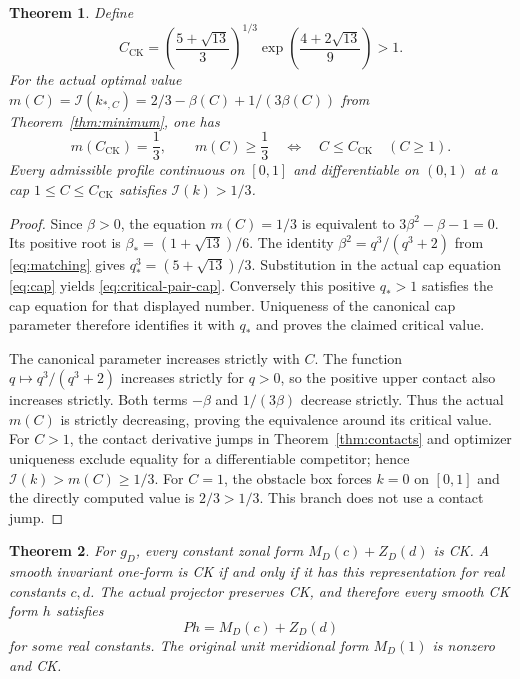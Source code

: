 \documentclass[11pt]{article}
\newtheorem{theorem}{Theorem}[section]
\newcommand{\I}{\mathcal I}
\begin{document}
\begin{theorem}\label{thm:critical-pair-cap}
Define
\begin{equation}\label{eq:critical-pair-cap}
 C_{\mathrm{CK}}
 =\left(\frac{5+\sqrt{13}}3\right)^{1/3}
       \exp\left(\frac{4+2\sqrt{13}}9\right)>1.
\end{equation}
For the actual optimal value
$m(C)=\I(k_{*,C})=2/3-\beta(C)+1/(3\beta(C))$ from
Theorem~\ref{thm:minimum}, one has
\[
 m(C_{\mathrm{CK}})=\frac13,\qquad
 m(C)\geq\frac13\quad\Longleftrightarrow\quad C\leq C_{\mathrm{CK}}
 \quad(C\geq1).
\]
Every admissible profile continuous on $[0,1]$ and differentiable on $(0,1)$
at a cap $1\leq C\leq C_{\mathrm{CK}}$ satisfies $\I(k)>1/3$.
\end{theorem}

\begin{proof}
Since $\beta>0$, the equation $m(C)=1/3$ is equivalent to
$3\beta^2-\beta-1=0$. Its positive root is
$\beta_*=(1+\sqrt{13})/6$. The identity
$\beta^2=q^3/(q^3+2)$ from \eqref{eq:matching} gives
$q_*^3=(5+\sqrt{13})/3$. Substitution in the actual cap equation
\eqref{eq:cap} yields \eqref{eq:critical-pair-cap}.
Conversely this positive $q_*>1$ satisfies the cap equation for that
displayed number. Uniqueness of the canonical cap parameter therefore
identifies it with $q_*$ and proves the claimed critical value.

The canonical parameter increases strictly with $C$.
The function $q\mapsto q^3/(q^3+2)$ increases strictly for $q>0$, so the
positive upper contact also increases strictly. Both terms
$-\beta$ and $1/(3\beta)$ decrease strictly. Thus the actual $m(C)$ is
strictly decreasing, proving the equivalence around its critical value.
For $C>1$, the contact derivative jumps in Theorem~\ref{thm:contacts}
and optimizer uniqueness exclude equality for a differentiable competitor;
hence $\I(k)>m(C)\geq1/3$.
For $C=1$, the obstacle box forces $k=0$ on $[0,1]$ and the directly
computed value is $2/3>1/3$. This branch does not use a contact jump.
\end{proof}

\begin{theorem}\label{thm:invariant-ck-classification}
For $g_D$, every constant zonal form $M_D(c)+Z_D(d)$ is CK.
A smooth invariant one-form is CK if and only if it has this representation
for real constants $c,d$. The actual projector preserves CK, and therefore
every smooth CK form $h$ satisfies
\[
 Ph=M_D(c)+Z_D(d)
\]
for some real constants. The original unit meridional form $M_D(1)$ is
nonzero and CK.
\end{theorem}
\end{document}
